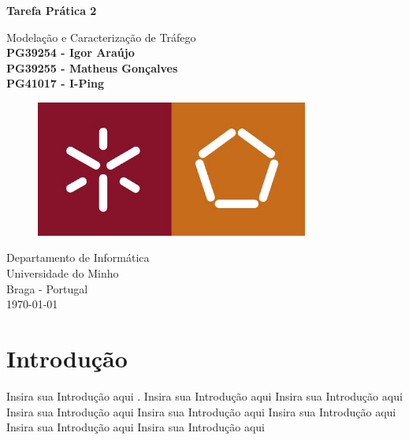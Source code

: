 \documentclass{llncs}
\begin{document}
\begin{titlepage}           
\end{titlepage}
\begin{titlepage}
  \begin{center}
    \vspace*{1cm}
    \Huge
    \textbf{Tarefa Prática 2}
    \vspace{0.5cm}
    
    \LARGE
    Modelação e Caracterização de Tráfego
    \vspace{1.0cm}
    \small
    \textbf{\\PG39254 - Igor Araújo\\PG39255 - Matheus Gonçalves\\PG41017 - I-Ping}
    
    \vspace{1.0cm}
    \begin{figure}[ht]
    \includegraphics[width=0.8\textwidth]{uminho.jpg}
    \centering
    \end{figure}
    
    \vspace{4.5cm}
    Departamento de Informática\\
    Universidade do Minho\\
    Braga - Portugal\\
    \today
          
  \end{center}
\end{titlepage}

\tableofcontents

\clearpage

\section{Introdução}

%
Insira sua Introdução aqui  \cite{castro}. Insira sua Introdução aqui  Insira sua Introdução aqui   Insira sua Introdução aqui \cite{racket}   Insira sua Introdução aqui   Insira sua Introdução aqui   Insira sua Introdução aqui \cite{deb:agra}   Insira sua Introdução aqui  
\end{document}
